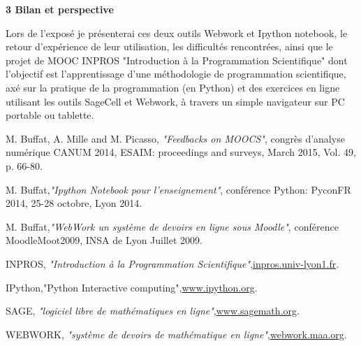 \documentclass[12pt,oneside,french]{article}
\begin{document}
\vspace{13pt}
{\Large{}\textbf{3 Bilan et perspective}}
\vspace{13pt}

Lors de l’exposé je présenterai ces deux outils Webwork et Ipython notebook, le retour
d’expérience de leur utilisation, les difficultés rencontrées, ainsi que le projet de MOOC
INPROS\cite{inpros} "Introduction à la Programmation Scientifique" dont 
l’objectif est l’apprentissage d’une méthodologie de programmation scientifique,
axé sur la pratique de la programmation (en Python) et des exercices en ligne
utilisant les outils SageCell et Webwork, à travers un simple navigateur sur PC
portable ou tablette.


\begin{thebibliography}{99}

	 {\sc M. Buffat, A. Mille and M. Picasso},{\sl
		"Feedbacks on MOOCS"}, { congrès d'analyse numérique CANUM
		2014, ESAIM: proceedings and surveys, March 2015, Vol. 49, p.
	66-80}.

	 {\sc M. Buffat},{\sl "Ipython Notebook pour
		l'enseignement"},{ conférence Python: PyconFR 2014, 25-28
		octobre, Lyon 2014}.

	 {\sc M. Buffat},{\sl "WebWork un système de devoirs
		en ligne sous Moodle"},{ conférence MoodleMoot2009, INSA de
		Lyon Juillet 2009}.

	 {\sc INPROS}, {\sl "Introduction \`a la Programmation
		Scientifique"},\href{http://inpros.univ-lyon1.fr}{inpros.univ-lyon1.fr}.

	 {\sc IPython},{"Python Interactive
		computing"},\href{http://www.ipython.org}{www.ipython.org}.

	 {\sc SAGE}, {\sl "logiciel libre de math\'ematiques en
		ligne"},\href{http://www.sagemath.org}{www.sagemath.org}.

	 {\sc WEBWORK}, {\sl "syst\`eme de devoirs de
		math\'ematique en ligne"},\href{http://webwork.maa.org}{webwork.maa.org}.

\end{thebibliography}
\end{document}
